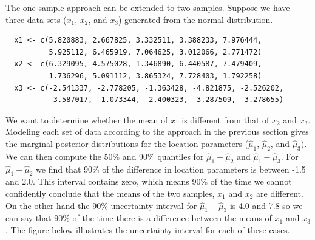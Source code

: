 \documentclass[12pt]{article}
\begin{document}
The one-sample approach can be extended to two samples. Suppose we have three data sets ($x_1$, $x_2$, and $x_3$) generated from the normal distribution.

\begin{verbatim}
  x1 <- c(5.820883, 2.667825, 3.332511, 3.388233, 7.976444,
          5.925112, 6.465919, 7.064625, 3.012066, 2.771472)
  x2 <- c(6.329095, 4.575028, 1.346890, 6.440587, 7.479409,
          1.736296, 5.091112, 3.865324, 7.728403, 1.792258)
  x3 <- c(-2.541337, -2.778205, -1.363428, -4.821875, -2.526202,
          -3.587017, -1.073344, -2.400323,  3.287509,  3.278655)
\end{verbatim}

\noindent We want to determine whether the mean of $x_1$ is different from that of $x_2$ and $x_3$. Modeling each set of data according to the approach in the previous section gives the marginal posterior distributions for the location parameters ($\hat{\mu}_1$, $\hat{\mu}_2$, and $\hat{\mu}_3$). We can then compute the 50\% and 90\% quantiles for $\hat{\mu}_1 - \hat{\mu}_2$ and $\hat{\mu}_1 - \hat{\mu}_3$. For $\hat{\mu}_1 - \hat{\mu}_2$ we find that 90\% of the difference in location parameters is between -1.5 and 2.0. This interval contains zero, which means 90\% of the time we cannot confidently conclude that the means of the two samples, $x_1$ and $x_2$ are different. On the other hand the 90\% uncertainty interval for $\hat{\mu}_1 - \hat{\mu}_3$ is 4.0 and 7.8 so we can say that 90\% of the time there is a difference between the means of $x_1$ and $x_3$. The figure below illustrates the uncertainty interval for each of these cases.
\end{document}
